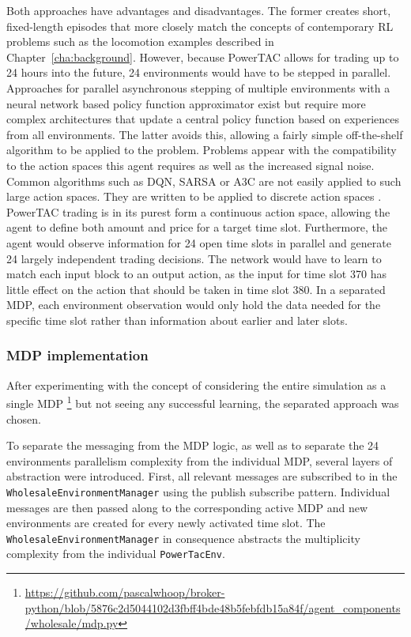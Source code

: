 Both approaches have advantages and disadvantages. The former creates short, fixed-length episodes that more closely
match the concepts of contemporary \ac{RL} problems such as the locomotion examples described in
Chapter~\ref{cha:background}. However, because \ac{PowerTAC} allows for trading up to 24 hours into the future, 24
environments would have to be stepped in parallel. Approaches for parallel asynchronous stepping of multiple
environments with a neural network based policy function approximator exist \cite{mnih2016asynchronous,hafner2017agents}
but require more complex architectures that update a central policy function based on experiences from all environments.
The latter avoids this, allowing a fairly simple off-the-shelf algorithm to be applied to the problem. Problems appear
with the compatibility to the action spaces this agent requires as well as the increased signal noise. Common algorithms
such as \ac{DQN}, \ac{SARSA} or \ac{A3C} are not easily applied to such large action spaces. They are written to be
applied to discrete action spaces \cite[]{baselines}. \ac{PowerTAC} trading is in its purest form a continuous action
space, allowing the agent to define both amount and price for a target time slot. Furthermore, the agent would observe
information for 24 open time slots in parallel and generate 24 largely independent trading decisions. The network would
have to learn to match each input block to an output action, as the input for time slot 370 has little effect on the
action that should be taken in time slot 380. In a separated \ac{MDP}, each environment observation would only hold the
data needed for the specific time slot rather than information about earlier and later slots.

\subsubsection{\ac{MDP} implementation}%
\label{sub:mdp_design_and_implementation}

After experimenting with the concept of considering the entire simulation as a single \ac{MDP}
\footnote{\url{https://github.com/pascalwhoop/broker-python/blob/5876c2d5044102d3fbff4bde48b5febfdb15a84f/agent_components/wholesale/mdp.py}}
but not seeing any successful learning, the separated approach was chosen.

To separate the messaging from the \ac{MDP} logic, as well as to separate the 24 environments parallelism complexity
from the individual \ac{MDP}, several layers of abstraction were introduced. First, all relevant messages are
subscribed to in the \texttt{WholesaleEnvironmentManager} using the publish subscribe pattern. Individual messages are
then passed along to the corresponding active \ac{MDP} and new environments are created for every newly activated
time slot. The \texttt{WholesaleEnvironmentManager} in consequence abstracts the multiplicity complexity from the individual
\texttt{PowerTacEnv}.


